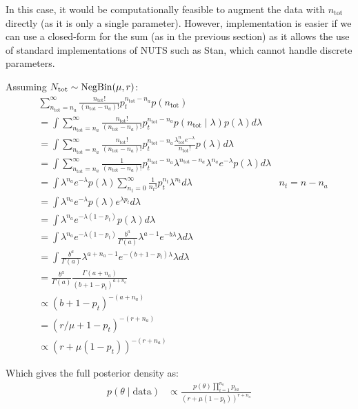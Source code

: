 \documentclass[thesis.tex]{subfiles}
\begin{document}
In this case, it would be computationally feasible to augment the data
with $n_\text{tot}$ directly (as it is only a single parameter).
However, implementation is easier if we can use a closed-form for the
sum (as in the previous section) as it allows the use of standard
implementations of NUTS such as Stan, which cannot handle discrete
parameters.

Assuming $N_\text{tot} \sim \operatorname{NegBin}(\mu, r)$:
\begin{align}
&\sum_{n_\text{tot}=n_a}^\infty \frac{n_\text{tot}!}{(n_\text{tot}-n_a)!} p_t^{n_\text{tot}-n_a} p(n_\text{tot}) \\
&= \int \sum_{n_\text{tot}=n_a}^\infty \frac{n_\text{tot}!}{(n_\text{tot}-n_a)!} p_t^{n_\text{tot}-n_a} p(n_\text{tot} \mid \lambda) p(\lambda) d\lambda \\
&= \int \sum_{n_\text{tot}=n_a}^\infty \frac{n_\text{tot}!}{(n_\text{tot}-n_a)!} p_t^{n_\text{tot}-n_a} \frac{\lambda^n_\text{tot} e^{-\lambda}}{n_\text{tot}!} p(\lambda) d\lambda \\
&= \int \sum_{n_\text{tot}=n_a}^\infty \frac{1}{(n_\text{tot}-n_a)!} p_t^{n_\text{tot}-n_a} \lambda^{n_\text{tot}-n_a} \lambda^{n_a} e^{-\lambda} p(\lambda) d\lambda \\
&= \int \lambda^{n_a} e^{-\lambda} p(\lambda) \sum_{n_t=0}^\infty \frac{1}{n_t!} p_t^{n_t} \lambda^{n_t} d\lambda &n_t = n-n_a\\
&= \int \lambda^{n_a} e^{-\lambda} p(\lambda) e^{\lambda p_t} d\lambda \\
&= \int \lambda^{n_a} e^{-\lambda(1 - p_t)} p(\lambda) d\lambda \\
&= \int \lambda^{n_a} e^{-\lambda(1 - p_t)} \frac{b^a}{\Gamma(a)} \lambda^{a-1} e^{-b\lambda} \lambda d\lambda \\
&= \int \frac{b^a}{\Gamma(a)} \lambda^{a+n_a-1} e^{-(b+1-p_t)\lambda} \lambda d\lambda \\
&= \frac{b^a}{\Gamma(a)} \frac{\Gamma(a+n_a)}{(b+1-p_t)^{a+n_a}} \\
&\propto (b+1-p_t)^{-(a+n_a)} \\
&= (r/\mu + 1 - p_t)^{-(r+n_a)} \\
&\propto(r + \mu (1- p_t))^{-(r+n_a)}
\end{align}

Which gives the full posterior density as:
\begin{align}
p(\theta \mid \text{data})
&\propto \frac{p(\theta) \prod_{i=1}^{n_a} p_{ia}}{(r + \mu(1 - p_t))^{r+n_a}}
\end{align}
\end{document}
